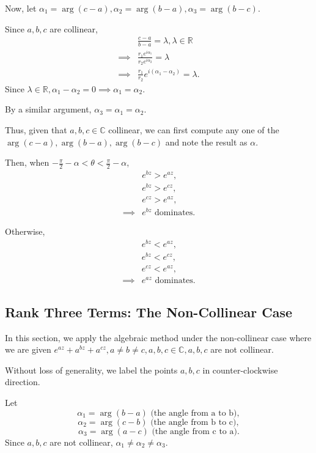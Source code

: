 \documentclass[11pt,reqno,oneside,a4paper]{article}
\begin{document}
Now, let $\alpha_1 = \arg(c-a), \alpha_2 = \arg(b-a), \alpha_3 = \arg(b-c).$

Since $a,b,c$ are collinear,
\begin{align*}
&\frac{c-a}{b-a} = \lambda, \lambda \in \mathbb{R}\\
\implies &\frac{r_1 e^{i\alpha_1}}{r_2 e^{i\alpha_2}} = \lambda \\
\implies &\frac{r_1}{r_2} e^{i(\alpha_1 - \alpha_2)} = \lambda.
\end{align*}
Since $\lambda\in\mathbb{R}, \alpha_1 - \alpha_2 = 0 \implies \alpha_1 = \alpha_2.$

By a similar argument, $\alpha_3 = \alpha_1 = \alpha_2.$

Thus, given that $a,b,c\in \mathbb{C}$ collinear, we can first compute any one of the $\arg(c-a),\arg(b-a),\arg(b-c)$ and note the result as $\alpha.$

Then, when $-\frac{\pi}{2} -\alpha < \theta < \frac{\pi}{2} - \alpha$, 
\begin{align*}
&e^{bz} > e^{az}, \\
&e^{bz} > e^{cz}, \\
&e^{cz} > e^{az}, \\
\implies &e^{bz} \text{ dominates.}
\end{align*}

Otherwise, 
\begin{align*}
&e^{bz} < e^{az}, \\
&e^{bz} < e^{cz}, \\
&e^{cz} < e^{az}, \\
\implies &e^{az} \text{ dominates.}
\end{align*}
 
\subsection{Rank Three Terms: The Non-Collinear Case}\label{subsec:algnoncol}

In this section, we apply the algebraic method under the non-collinear case where we are given $e^{az}+a^{bz} + a^{cz}, a\neq b \neq c, a,b,c \in \mathbb{C}, a,b,c$ are not collinear.

Without loss of generality, we label the points $a,b,c$ in counter-clockwise direction. 

Let 
$$\alpha_1 = \arg(b-a) \text{ (the angle from a to b)},$$
$$\alpha_2 = \arg(c-b) \text{ (the angle from b to c)},$$
$$\alpha_3 = \arg(a-c) \text{ (the angle from c to a)}.$$
Since $a,b,c$ are not collinear, $\alpha_1 \neq \alpha_2 \neq \alpha_3.$
\end{document}
